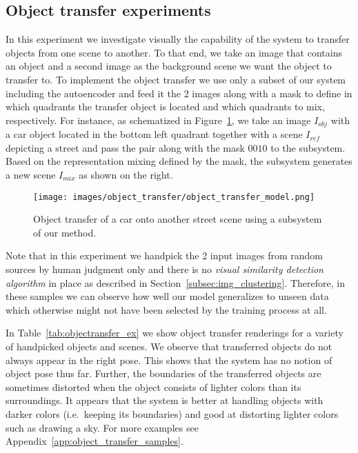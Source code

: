 \documentclass[a4paper,12pt]{report}
\begin{document}
\subsection{Object transfer experiments}\label{subsubsec:objTransfExp}
In this experiment we investigate visually the capability of the system to transfer objects from one scene to another. To that end, we take an image that contains an object and a second image as the background scene we want the object to transfer to. To implement the object transfer we use only a subset of our system including the autoencoder and feed it the 2 images along with a mask to define in which quadrants the transfer object is located and which quadrants to mix, respectively. For instance, as schematized in Figure~\ref{fig:objectransfer_arch}, we take an image $I_{obj}$ with a car object located in the bottom left quadrant together with a scene $I_{ref}$ depicting a street and pass the pair along with the mask $0010$ to the subsystem. Based on the representation mixing defined by the mask, the subsystem generates a new scene $I_{mix}$ as shown on the right.
\begin{figure}[ht]
\centering
\texttt{[image: images/object\_transfer/object\_transfer\_model.png]}
\caption{Object transfer of a car onto another street scene using a subsystem of our method.}
\label{fig:objectransfer_arch}
\end{figure}
Note that in this experiment we handpick the 2 input images from random sources by human judgment only and there is no \textit{visual similarity detection algorithm} in place as described in Section~\ref{subsec:img_clustering}. Therefore, in these samples we can observe how well our model generalizes to unseen data which otherwise might not have been selected by the training process at all.

In Table~\ref{tab:objectransfer_ex} we show object transfer renderings for a variety of handpicked objects and scenes. We observe that transferred objects do not always appear in the right pose. This shows that the system has no notion of object pose thus far. Further, the boundaries of the transferred objects are sometimes distorted when the object consists of lighter colors than its surroundings. It appears that the system is better at handling objects with darker colors (i.e.\ keeping its boundaries) and good at distorting lighter colors such as drawing a sky. For more examples see Appendix~\ref{app:object_transfer_samples}.

\end{document}
